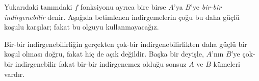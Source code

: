 Yukarıdaki tanımdaki $f$ fonksiyonu ayrıca bire birse $A$'ya $B$'ye
\emph{bir-bir indirgenebilir} denir. Aşağıda betimlenen indirgemelerin çoğu
bu daha güçlü koşulu karşılar; fakat bu olguyu kullanmayacağız.

\begin{digress}
Bir-bir indirgenebilirliğin gerçekten çok-bir indirgenebilirlikten daha güçlü
bir koşul olması doğru, fakat hiç de açık değildir. Başka bir deyişle,
$A$'nın $B$'ye çok-bir indirgenebilir fakat bir-bir indirgenemez olduğu sonsuz
$A$ ve $B$ kümeleri vardır.
\end{digress}

